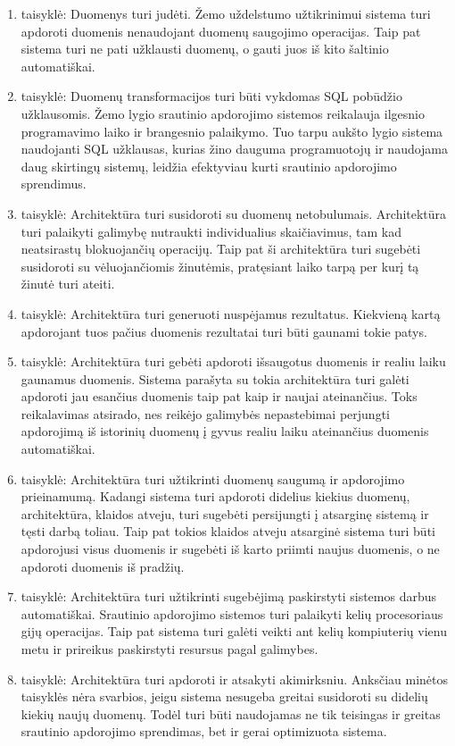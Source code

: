 \documentclass{VUMIFPSkursinis}
\begin{document}
\begin{enumerate}[label=\arabic*]
    \item taisyklė: Duomenys turi judėti. Žemo uždelstumo užtikrinimui sistema turi apdoroti duomenis nenaudojant duomenų saugojimo operacijas. Taip pat sistema turi ne pati užklausti duomenų, o gauti juos
    iš kito šaltinio automatiškai. 
    \item taisyklė: Duomenų transformacijos turi būti vykdomas SQL pobūdžio užklausomis. Žemo lygio srautinio apdorojimo sistemos reikalauja ilgesnio programavimo laiko ir brangesnio palaikymo. Tuo tarpu aukšto lygio sistema 
    naudojanti SQL užklausas, kurias žino dauguma programuotojų ir naudojama daug skirtingų sistemų, leidžia efektyviau kurti srautinio apdorojimo sprendimus.
    \item taisyklė: Architektūra turi susidoroti su duomenų netobulumais. Architektūra turi palaikyti galimybę nutraukti individualius skaičiavimus, tam kad neatsirastų blokuojančių operacijų. Taip pat ši 
    architektūra turi sugebėti susidoroti su vėluojančiomis žinutėmis, pratęsiant laiko tarpą per kurį tą žinutė turi ateiti.
    \item taisyklė: Architektūra turi generuoti nuspėjamus rezultatus. Kiekvieną kartą apdorojant tuos pačius duomenis rezultatai turi būti gaunami tokie patys.
    \item taisyklė: Architektūra turi gebėti apdoroti išsaugotus duomenis ir realiu laiku gaunamus duomenis. Sistema parašyta su tokia architektūra turi galėti apdoroti jau esančius duomenis taip pat kaip ir 
    naujai ateinančius. Toks reikalavimas atsirado, nes reikėjo galimybės nepastebimai perjungti apdorojimą iš istorinių duomenų į gyvus realiu laiku ateinančius duomenis automatiškai.
    \item taisyklė: Architektūra turi užtikrinti duomenų saugumą ir apdorojimo prieinamumą. Kadangi sistema turi apdoroti didelius kiekius duomenų, architektūra, klaidos atveju, turi sugebėti persijungti į atsarginę
    sistemą ir tęsti darbą toliau. Taip pat tokios klaidos atveju atsarginė sistema turi būti apdorojusi visus duomenis ir sugebėti iš karto priimti naujus duomenis, o ne apdoroti duomenis iš pradžių.
    \item taisyklė: Architektūra turi užtikrinti sugebėjimą paskirstyti sistemos darbus automatiškai. Srautinio apdorojimo sistemos turi palaikyti kelių procesoriaus gijų operacijas. Taip pat sistema turi galėti 
    veikti ant kelių kompiuterių vienu metu ir prireikus paskirstyti resursus pagal galimybes.
    \item taisyklė: Architektūra turi apdoroti ir atsakyti akimirksniu. Anksčiau minėtos taisyklės nėra svarbios, jeigu sistema nesugeba greitai susidoroti su didelių kiekių naujų duomenų. 
    Todėl turi būti naudojamas ne tik teisingas ir greitas srautinio apdorojimo sprendimas, bet ir gerai optimizuota sistema.
\end{enumerate}\par
\end{document}
